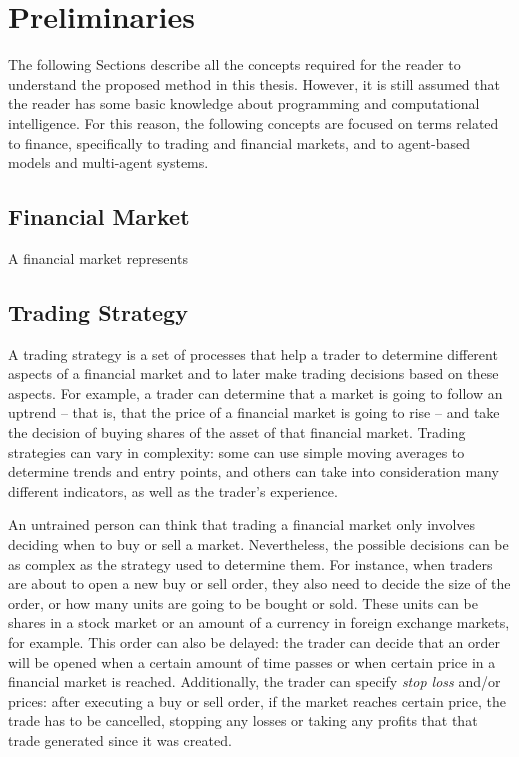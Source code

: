 \chapter{Preliminaries}
\label{chapter:preliminaries}

The following Sections describe all the concepts required for the reader to understand the proposed method in this thesis. However, it is still assumed that the reader has some basic knowledge about programming and computational intelligence. For this reason, the following concepts are focused on terms related to finance, specifically to trading and financial markets, and to agent-based models and multi-agent systems.

\section{Financial Market}
\label{section:financial-market}

A financial market represents

\section{Trading Strategy}
\label{section:trading-strategy}

A trading strategy is a set of processes that help a trader to determine different aspects of a financial market and to later make trading decisions based on these aspects. For example, a trader can determine that a market is going to follow an uptrend -- that is, that the price of a financial market is going to rise -- and take the decision of buying shares of the asset of that financial market. Trading strategies can vary in complexity: some can use simple moving averages to determine trends and entry points, and others can take into consideration many different indicators, as well as the trader's experience.

An untrained person can think that trading a financial market only involves deciding when to buy or sell a market. Nevertheless, the possible decisions can be as complex as the strategy used to determine them. For instance, when traders are about to open a new buy or sell order, they also need to decide the size of the order, or how many units are going to be bought or sold. These units can be shares in a stock market or an amount of a currency in foreign exchange markets, for example. This order can also be delayed: the trader can decide that an order will be opened when a certain amount of time passes or when certain price in a financial market is reached. Additionally, the trader can specify \textit{stop loss} and/or  prices: after executing a buy or sell order, if the market reaches certain price, the trade has to be cancelled, stopping any losses or taking any profits that that trade generated since it was created.

